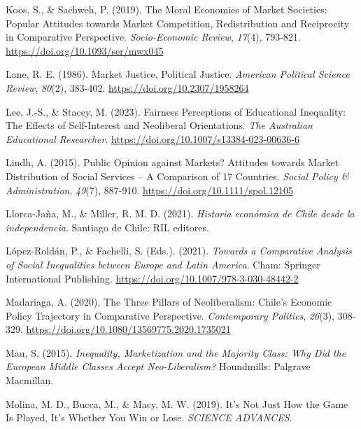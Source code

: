 \documentclass[
  spanish,
  letterpaper,
  DIV=11,
  numbers=noendperiod,
  oneside]{scrartcl}
\newlength{\cslhangindent}
\newenvironment{CSLReferences}[2] %
 {\begin{list}{}{%
  \setlength{\itemindent}{0pt}
  \setlength{\leftmargin}{0pt}
  \setlength{\parsep}{0pt}
  \ifodd #1
   \setlength{\leftmargin}{\cslhangindent}
   \setlength{\itemindent}{-1\cslhangindent}
  \fi
  \setlength{\itemsep}{#2\baselineskip}}}
 {\end{list}}
\begin{document}
\begin{CSLReferences}{1}{0}
Koos, S., \& Sachweh, P. (2019). The Moral Economies of Market
Societies: Popular Attitudes towards Market Competition, Redistribution
and Reciprocity in Comparative Perspective. \emph{Socio-Economic
Review}, \emph{17}(4), 793-821. \url{https://doi.org/10.1093/ser/mwx045}

Lane, R. E. (1986). Market {Justice}, {Political Justice}.
\emph{American Political Science Review}, \emph{80}(2), 383-402.
\url{https://doi.org/10.2307/1958264}

Lee, J.-S., \& Stacey, M. (2023). Fairness Perceptions of Educational
Inequality: The Effects of Self-Interest and Neoliberal Orientations.
\emph{The Australian Educational Researcher}.
\url{https://doi.org/10.1007/s13384-023-00636-6}

Lindh, A. (2015). Public {Opinion} against {Markets}? {Attitudes}
towards {Market Distribution} of {Social Services} -- {A Comparison} of
17 {Countries}. \emph{Social Policy \& Administration}, \emph{49}(7),
887-910. \url{https://doi.org/10.1111/spol.12105}

Llorca-Jaña, M., \& Miller, R. M. D. (2021). \emph{{Historia econ{ó}mica
de Chile desde la independencia}}. Santiago de Chile: RIL editores.

López-Roldán, P., \& Fachelli, S. (Eds.). (2021). \emph{Towards a
{Comparative Analysis} of {Social Inequalities} between {Europe} and
{Latin America}}. Cham: Springer International Publishing.
\url{https://doi.org/10.1007/978-3-030-48442-2}

Madariaga, A. (2020). The Three Pillars of Neoliberalism: {Chile}'s
Economic Policy Trajectory in Comparative Perspective.
\emph{Contemporary Politics}, \emph{26}(3), 308-329.
\url{https://doi.org/10.1080/13569775.2020.1735021}

Mau, S. (2015). \emph{Inequality, {Marketization} and the {Majority
Class}: {Why Did} the {European Middle Classes Accept Neo-Liberalism}?}
Houndmills: Palgrave Macmillan.

Molina, M. D., Bucca, M., \& Macy, M. W. (2019). It's Not Just How the
Game Is Played, It's Whether You Win or Lose. \emph{SCIENCE ADVANCES}.


\end{CSLReferences}
\end{document}
